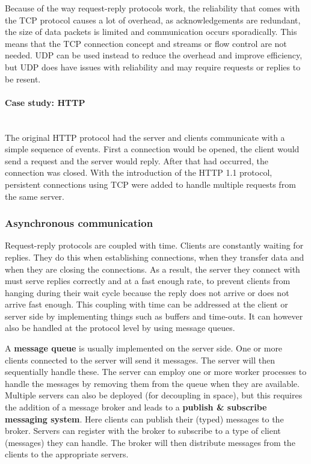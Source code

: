 \documentclass[a4paper]{article}
\newcommand{\subsubsubsection}[1]{\paragraph{#1}\mbox{}\\}
\begin{document}
Because of the way request-reply protocols work, the reliability that comes with the TCP protocol causes a lot of overhead, as acknowledgements are redundant, the size of data packets is limited and communication occurs sporadically. This means that the TCP connection concept and streams or flow control are not needed. UDP can be used instead to reduce the overhead and improve efficiency, but UDP does have issues with reliability and may require requests or replies to be resent.

\subsubsubsection{Case study: HTTP}

The original HTTP protocol had the server and clients communicate with a simple sequence of events. First a connection would be opened, the client would send a request and the server would reply. After that had occurred, the connection was closed. With the introduction of the HTTP 1.1 protocol, persistent connections using TCP were added to handle multiple requests from the same server.

\subsubsection{Asynchronous communication}

Request-reply protocols are coupled with time. Clients are constantly waiting for replies. They do this when establishing connections, when they transfer data and when they are closing the connections. As a result, the server they connect with must serve replies correctly and at a fast enough rate, to prevent clients from hanging during their wait cycle because the reply does not arrive or does not arrive fast enough. This coupling with time can be addressed at the client or server side by implementing things such as buffers and time-outs. It can however also be handled at the protocol level by using message queues.

A \textbf{message queue} is usually implemented on the server side. One or more clients connected to the server will send it messages. The server will then sequentially handle these. The server can employ one or more worker processes to handle the messages by removing them from the queue when they are available. Multiple servers can also be deployed (for decoupling in space), but this requires the addition of a message broker and leads to a \textbf{publish \& subscribe messaging system}. Here clients can publish their (typed) messages to the broker. Servers can register with the broker to subscribe to a type of client (messages) they can handle. The broker will then distribute messages from the clients to the appropriate servers.
\end{document}
